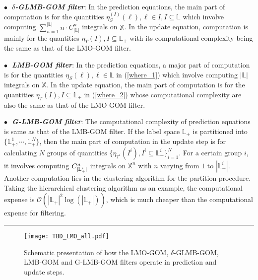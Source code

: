 \documentclass[journal]{IEEEtran}
\begin{document}
{\begin{table}[h]
$\bullet\,\,$
\textit{\textbf{$\delta$-GLMB-GOM filter}}:  In the prediction equations, the main part of computation is for the quantities $\eta_{S}^{(I)}(\ell), \ell\in I, I\subseteq\mathbb{L}$ which involve computing $\sum_{n=1}^{|\mathbb{L}|}n\cdot C_{|\mathbb{L}|}^n$ integrals on  $\mathbb{X}$. In the update equation, computation is mainly for the quantities $\eta_{\Upsilon}(I), I\subseteq\mathbb{L_+}$ with its computational complexity being the same as that of the LMO-GOM filter. 
\vspace{2mm}

$\bullet\,\,$
\textit{\textbf{LMB-GOM filter}}:  In the prediction equations, a major part of computation is for the quantities $\eta_{S}(\ell), \ell\in\mathbb{L}$ in (\ref{where_1}) which involve computing $|\mathbb{L}|$ integrals on  $\mathbb{X}$. In the update equation, the main part of computation is for the quantities $\eta_{\Upsilon}(I), I\subseteq\mathbb{L}_+$ in (\ref{where_2}) whose computational complexity are also the same as that of the LMO-GOM filter. 
\vspace{2mm}

$\bullet\,\,$
\textit{\textbf{G-LMB-GOM filter}}:  The computational complexity of prediction equations is same as that of the LMB-GOM filter. If the label space $\mathbb{L}_+$ is  partitioned into $\{\mathbb{L}^{1}_+,\cdots,\mathbb{L}_+^{N}\}$, then  the main part of computation in the update step is for calculating $N$ groups of  quantities $\{\eta_{\Upsilon^{i}}(I^i), I^i\subseteq\mathbb{L}^{i}_+\}_{i=1}^N$. For a certain group $i$,  it involves computing $C_{{\small{|\mathbb{L}^{i}_+}}|}^n$ integrals on $\mathbb{X}^n$ with $n$ varying from $1$ to $|\mathbb{L}^{i}_+|$.  Another computation lies in the clustering algorithm  for the partition procedure. 
Taking the  hierarchical clustering    algorithm \cite{refr:clustering_method} as an example,
the computational expense  is $\mathcal{O}(|\mathbb{L}_{+}|^{2}\log(|\mathbb{L}_{+}|))$, which is much cheaper than the computational expense for filtering.
\vspace{2mm}\hrule
\end{table}
\begin{figure}[t]
\centering
\texttt{[image: TBD\_LMO\_all.pdf]}\\
  \caption{Schematic presentation of how the LMO-GOM, $\delta$-GLMB-GOM, LMB-GOM and G-LMB-GOM filters operate in  prediction and update steps.}
  \label{fig:flow}
\end{figure}

}
\end{document}
